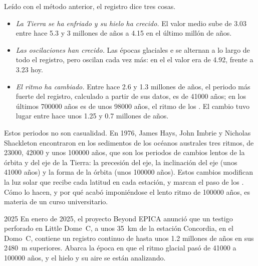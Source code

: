Leído con el método anterior, el registro dice tres cosas.
\begin{itemize}
  \item \emph{La Tierra se ha enfriado y su hielo ha crecido.} El valor medio
        sube de \qty{3.03}{\permil} entre hace 5.3 y 3 millones de años
        a \qty{4.15}{\permil} en el último millón de años.
  \item \emph{Las oscilaciones han crecido.} Las épocas glaciales e 
        se alternan a lo largo de todo el registro, pero oscilan cada vez más: en
        el  el valor era de \qty{4.92}{\permil}, frente a
        \qty{3.23}{\permil} hoy.
  \item \emph{El ritmo ha cambiado.} Entre hace 2.6 y 1.3 millones de años,
        el periodo más fuerte del registro, calculado a partir de sus datos, es de
        \num{41000} años; en los últimos \num{700000} años es de unos
        \num{98000} años, el ritmo de los . El cambio tuvo
        lugar entre hace unos 1.25 y 0.7 millones de años.
\end{itemize}

Estos periodos no son casualidad. En 1976, James Hays, John Imbrie y Nicholas
Shackleton encontraron en los sedimentos de los océanos australes tres ritmos, de
\num{23000}, \num{42000} y unos \num{100000} años, que son los periodos
de cambios lentos de la órbita y del eje de la Tierra: la precesión del eje,
la inclinación del eje (unos \num{41000} años) y la forma de la órbita
(unos \num{100000} años). Estos cambios modifican la luz solar que recibe cada
latitud en cada estación, y marcan el paso de los . Cómo lo hacen, y por qué acabó imponiéndose el lento ritmo de \num{100000} años,
es materia de un curso universitario.

\begin{dated}{2025}
En enero de 2025, el proyecto Beyond EPICA anunció que un testigo perforado en
Little Dome~C, a unos \qty{35}{km} de la estación Concordia, en el Domo~C, contiene
un registro continuo de hasta unos 1.2 millones de años en sus
\qty{2480}{m} superiores. Abarca la época
en que el ritmo glacial pasó de \num{41000} a \num{100000} años, y el
hielo y su aire se están analizando.
\end{dated}

